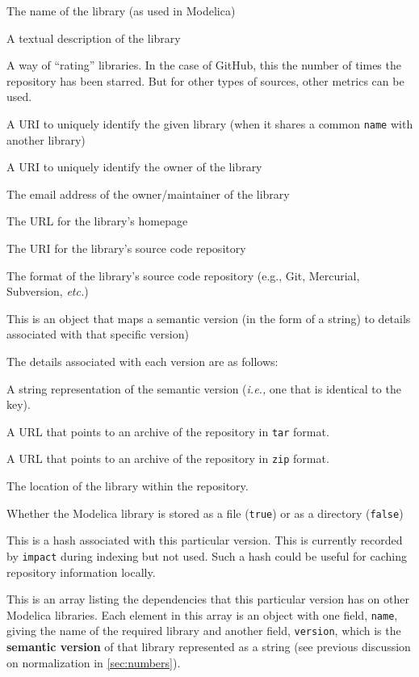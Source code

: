 \documentclass[11pt,a4paper,twocolumn]{article}
\newcommand{\code}[1]{\texttt{#1}} %
\begin{document}
\begin{description}[noitemsep]
  \item[\code{name}] The name of the library (as used in Modelica)
  \item[\code{description}] A textual description of the library
  \item[\code{stars}] A way of ``rating'' libraries.  In the case of
    GitHub, this the number of times the repository has been starred.
    But for other types of sources, other metrics can be used.
  \item[\code{uri}] A URI to uniquely identify the given library (when
    it shares a common \code{name} with another library)
  \item[\code{owner\_uri}] A URI to uniquely identify the owner of the
    library
  \item[\code{email}] The email address of the owner/maintainer of the
    library
  \item[\code{homepage}] The URL for the library's homepage
  \item[\code{repository}] The URI for the library's source code
    repository
  \item[\code{format}] The format of the library's source code
    repository (e.g., Git, Mercurial, Subversion, \emph{etc.})
  \item[\code{versions}] This is an object that maps a semantic
    version (in the form of a string) to details associated with that
    specific version)
\end{description}

The details associated with each version are as follows:

\begin{description}[noitemsep]
  \item[\code{version}] A string representation of the semantic
    version (\emph{i.e.,} one that is identical to the key).
  \item[\code{tarball\_url}] A URL that points to an archive of the
    repository in \code{tar} format.
  \item[\code{zipball\_url}] A URL that points to an archive of the
    repository in \code{zip} format.
  \item[\code{path}] The location of the library within the
    repository.
  \item[\code{isfile}] Whether the Modelica library is stored as a
    file (\code{true}) or as a directory (\code{false})
  \item[\code{sha}] This is a hash associated with this particular
    version.  This is currently recorded by \code{impact} during
    indexing but not used.  Such a hash could be useful for caching
    repository information locally.
  \item[\code{dependencies}] This is an array listing the dependencies
    that this particular version has on other Modelica libraries.
    Each element in this array is an object with one field,
    \code{name}, giving the name of the required library and another
    field, \code{version}, which is the \textbf{semantic version} of that
    library represented as a string (see previous discussion on
    normalization in \ref{sec:numbers}).
\end{description}
\end{document}

